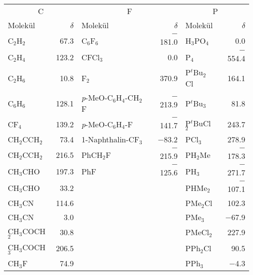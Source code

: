 \begin{table}[ht!]
  	\centering
	\captionsetup{tablewithin = chapter}
	\captionsetup{font=small, labelfont=bf}
    \begin{tabular}{lr|lr|lr}
    \hline
    \hline
    \multicolumn{2}{c}{C} & \multicolumn{2}{c}{F} & \multicolumn{2}{c}{P} \\
    Molekül & $\delta$ & Molekül & $\delta$ & Molekül & $\delta$ \\
    \hline
    C$_{2}$H$_{2}$  & 67.3  & C$_{6}$F$_{6}$  & $-$181.0 & H$_3$PO$_4$ & 0.0 \\
    C$_{2}$H$_{4}$  & 123.2 & CFCl$_{3}$ & 0.0   & P$_4$    & $-$554.4 \\
    C$_{2}$H$_{6}$  & 10.8  & F$_{2}$    & 370.9 & P$^\textit{t}$Bu$_2$Cl & 164.1 \\
    C$_{6}$H$_{6}$  & 128.1 & \textit{p}-MeO-C$_{6}$H$_{4}$-CH$_{2}$F & $-$213.9 & P$^\textit{t}$Bu$_3$ & 81.8 \\
    CF$_{4}$   & 139.2 & \textit{p}-MeO-C$_{6}$H$_{4}$-F & $-$141.7 & P$^\textit{t}$BuCl$_2$ & 243.7 \\
    CH$_{2}$CCH$_{2}$ & 73.4  & 1-Naphthalin-CF$_{3}$ & $-$83.2 & PCl$_3$  & 278.9 \\
    CH$_{2}$CCH$_{2}$ & 216.5 & PhCH$_{2}$F & $-$215.9 & PH$_2$Me & $-$178.3 \\
    CH$_{3}$CHO & 197.3 & PhF   & $-$125.6 & PH$_3$   & $-$271.7 \\
    CH$_{3}$CHO & 33.2 &       &  & PHMe$_{2}$ & $-$107.1  \\
    CH$_{3}$CN & 114.6 &       &  & PMe$_{2}$Cl & 102.3   \\
    CH$_{3}$CN & 3.0   &       &  & PMe$_{3}$  & $-$67.9   \\
    CH$_{3}$COCH$_{2}$ & 30.8  &       &  & PMeCl$_{2}$ & 227.9   \\
    CH$_{3}$COCH$_{3}$ & 206.5 &       &  & PPh$_{2}$Cl & 90.5    \\
    CH$_{3}$F  & 74.9  &       &  & PPh$_{3}$  & $-$4.3    \\

\end{tabular}
\end{table}
